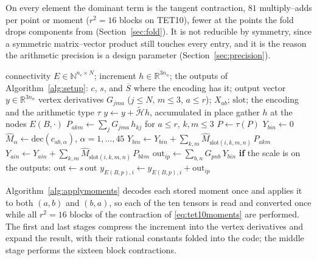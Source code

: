 \documentclass[sigconf,balance=false]{acmart}
\newcommand{\R}{\mathbb{R}}
\newcommand{\Sbar}{\overline{S}}
\begin{document}
On every element the dominant term is the tangent contraction, $81$ multiply--adds per point or
moment ($r^2=16$ blocks on TET10), fewer at the points the fold drops components from
(Section~\ref{sec:fold}).  It is not reducible by symmetry, since a symmetric matrix--vector product still touches every entry, and it is
the reason the arithmetic precision is a design parameter (Section~\ref{sec:precision}).

\begin{algorithm*}[t]
\caption{Application, moment schedule (TET10; TET4 with $r=1$)}
\label{alg:applymoments}
\begin{algorithmic}[1]
\Require connectivity $E\in\mathbb{N}^{n_e\times N}$; increment $h\in\R^{3n_n}$; the outputs of
  Algorithm~\ref{alg:setup}: $c$, $s$, and $\Sbar$ where the encoding has it; output vector
  $y\in\R^{3n_n}$
\Constants vertex derivatives $G_{jma}$ ($j\le N$, $m\le3$, $a\le r$); $X_{ab}$; $\mathrm{slot}$;
  the encoding and the arithmetic type $\tau$
\Ensure $y \gets y + \widetilde{\mathcal{H}}h$, accumulated in place
  \State gather $h$ at the nodes $E(B,\cdot)$ 
  \State $P_{akm} \gets \sum_j G_{jma}\, h_{kj}$ for $a\le r$, $k,m\le 3$
  \State $P \gets \tau(P)$
  \State $Y_{bin} \gets 0$
    \State $\widehat M_\alpha \gets \mathrm{dec}(c_{ab,\alpha})$, $\alpha=1,\dots,45$
    \State $Y_{bin} \gets Y_{bin} + \sum_{k,m} \widehat M_{\mathrm{slot}(i,k,m,n)}\, P_{akm}$
      \State $Y_{ain} \gets Y_{ain} + \sum_{k,m} \widehat M_{\mathrm{slot}(i,k,m,n)}\, P_{bkm}$
    \EndIf
  \EndFor
  \State $\mathrm{out}_{ip} \gets \sum_{b,n} G_{pnb}\, Y_{bin}$ 
  \State \textbf{if} the scale is on the outputs: $\mathrm{out} \gets s\,\mathrm{out}$
  \State $y_{E(B,p),i} \gets y_{E(B,p),i} + \mathrm{out}_{ip}$ 
\EndFor
\end{algorithmic}
\end{algorithm*}

Algorithm~\ref{alg:applymoments} decodes each stored moment once and applies it to both
$(a,b)$ and $(b,a)$, so each of the ten tensors is read and converted once while all $r^2=16$
blocks of the contraction of \eqref{eq:tet10moments} are performed.  The first and last stages
compress the increment into the vertex derivatives and expand the result, with their rational
constants folded into the code; the middle stage performs the sixteen block contractions.
\end{document}
